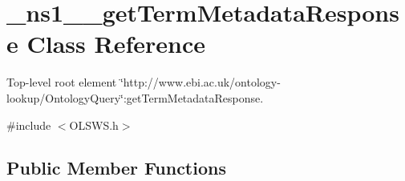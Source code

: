 \hypertarget{class__ns1____getTermMetadataResponse}{
\section{\_\-ns1\_\-\_\-getTermMetadataResponse Class Reference}
\label{class__ns1____getTermMetadataResponse}
}


Top-\/level root element \char`\"{}http://www.ebi.ac.uk/ontology-\/lookup/OntologyQuery\char`\"{}:getTermMetadataResponse.  




{\ttfamily \#include $<$OLSWS.h$>$}

\subsection*{Public Member Functions}
